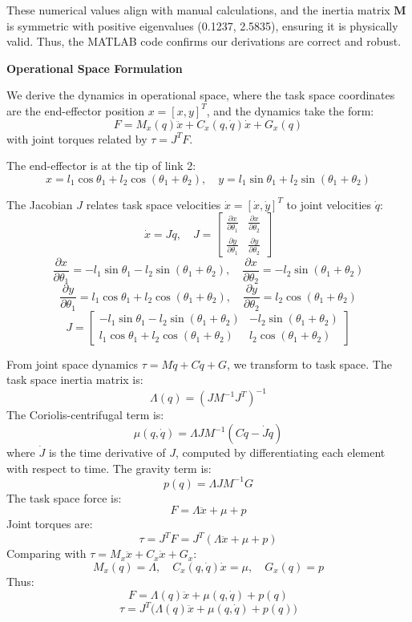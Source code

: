 \documentclass[12pt,a4paper]{article}
\begin{document}
These numerical values align with manual calculations, and the inertia matrix \( \bm{M} \) is symmetric with positive eigenvalues (0.1237, 2.5835), ensuring it is physically valid. Thus, the MATLAB code confirms our derivations are correct and robust.

\textbf{Operational Space Formulation}

We derive the dynamics in operational space, where the task space coordinates are the end-effector position \( x = [x, y]^T \), and the dynamics take the form:
\[
F = M_x(q) \ddot{x} + C_x(q, \dot{q}) \dot{x} + G_x(q)
\]
with joint torques related by \( \tau = J^T F \).

The end-effector is at the tip of link 2:
\[
x = l_1 \cos \theta_1 + l_2 \cos (\theta_1 + \theta_2), \quad y = l_1 \sin \theta_1 + l_2 \sin (\theta_1 + \theta_2)
\]

The Jacobian \( J \) relates task space velocities \( \dot{x} = [\dot{x}, \dot{y}]^T \) to joint velocities \( \dot{q} \):
\[
\dot{x} = J \dot{q}, \quad J = \begin{bmatrix}
\frac{\partial x}{\partial \theta_1} & \frac{\partial x}{\partial \theta_2} \\
\frac{\partial y}{\partial \theta_1} & \frac{\partial y}{\partial \theta_2}
\end{bmatrix}
\]
\[
\frac{\partial x}{\partial \theta_1} = -l_1 \sin \theta_1 - l_2 \sin (\theta_1 + \theta_2), \quad \frac{\partial x}{\partial \theta_2} = -l_2 \sin (\theta_1 + \theta_2)
\]
\[
\frac{\partial y}{\partial \theta_1} = l_1 \cos \theta_1 + l_2 \cos (\theta_1 + \theta_2), \quad \frac{\partial y}{\partial \theta_2} = l_2 \cos (\theta_1 + \theta_2)
\]
\[
J = \begin{bmatrix}
-l_1 \sin \theta_1 - l_2 \sin (\theta_1 + \theta_2) & -l_2 \sin (\theta_1 + \theta_2) \\
l_1 \cos \theta_1 + l_2 \cos (\theta_1 + \theta_2) & l_2 \cos (\theta_1 + \theta_2)
\end{bmatrix}
\]

From joint space dynamics \( \tau = M \ddot{q} + C \dot{q} + G \), we transform to task space. The task space inertia matrix is:
\[
\Lambda(q) = (J M^{-1} J^T)^{-1}
\]
The Coriolis-centrifugal term is:
\[
\mu(q, \dot{q}) = \Lambda J M^{-1} (C \dot{q} - \dot{J} \dot{q})
\]
where \( \dot{J} \) is the time derivative of \( J \), computed by differentiating each element with respect to time. The gravity term is:
\[
p(q) = \Lambda J M^{-1} G
\]
The task space force is:
\[
F = \Lambda \ddot{x} + \mu + p
\]
Joint torques are:
\[
\tau = J^T F = J^T (\Lambda \ddot{x} + \mu + p)
\]
Comparing with \( \tau = M_x \ddot{x} + C_x \dot{x} + G_x \):
\[
M_x(q) = \Lambda, \quad C_x(q, \dot{q}) \dot{x} = \mu, \quad G_x(q) = p
\]
Thus:
\[
F = \Lambda(q) \ddot{x} + \mu(q, \dot{q}) + p(q)
\]
\[
\tau = J^T \big( \Lambda(q) \ddot{x} + \mu(q, \dot{q}) + p(q) \big)
\]
\end{document}
